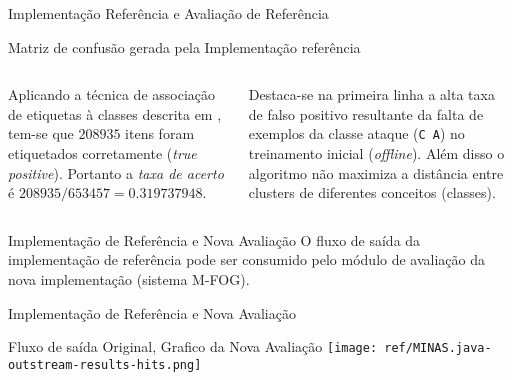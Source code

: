 \documentclass[aspectratio=43,10pt]{beamer}
\newcommand{\mfog}{sistema M-FOG\xspace}
\begin{document}
\begin{frame}[fragile]{Implementação Referência e Avaliação de Referência}
\begin{alertblock}{Matriz de confusão gerada pela Implementação referência}
\begin{columns}[T,onlytextwidth]
      Aplicando a técnica de associação de etiquetas à classes descrita em \cite{Faria2016minas},
      tem-se que $208935$ itens foram etiquetados corretamente (\textit{true positive}).
      Portanto a \textsl{taxa de acerto} é $208935 / 653457 = 0.319737948$.

      Destaca-se na primeira linha a alta taxa de falso positivo resultante
      da falta de exemplos da classe ataque (\texttt{C A}) no treinamento inicial
      (\textit{offline}). Além disso o algoritmo não maximiza a distância entre
      clusters de diferentes conceitos (classes).
    \end{columns}
  \end{alertblock}
\end{frame}


\begin{frame}[fragile]{Implementação de Referência e Nova Avaliação}
  O fluxo de saída da implementação de referência pode ser consumido pelo módulo
  de avaliação da nova implementação (\mfog).
\end{frame}

\begin{frame}[fragile]{Implementação de Referência e Nova Avaliação}
  \begin{alertblock}{Fluxo de saída Original, Grafico da Nova Avaliação}
    \texttt{[image: ref/MINAS.java-outstream-results-hits.png]}
  \end{alertblock}
\end{frame}
\end{document}

